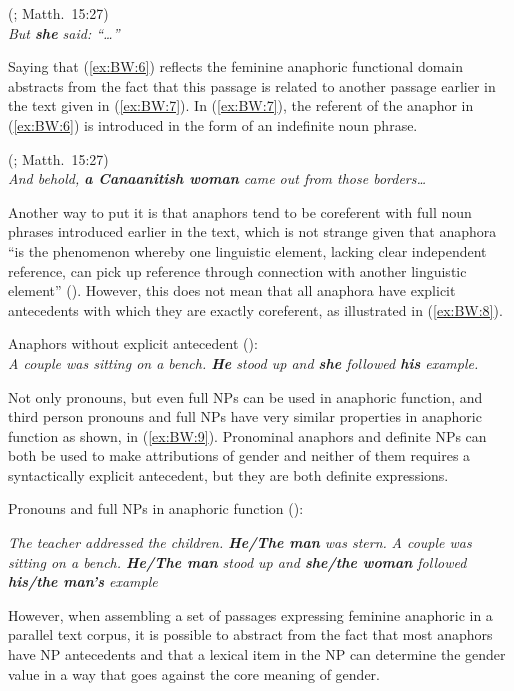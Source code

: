 \documentclass[output=collectionpaper]{langsci/langscibook}
\begin{document}
\ea\label{ex:BW:6}
 (; Matth.~15:27)\\
\textit{But \textbf{she} said: ``\ldots''}
\z

Saying that (\ref{ex:BW:6}) reflects the feminine anaphoric functional domain abstracts from the fact that this passage is related to another passage earlier in the text given in (\ref{ex:BW:7}). In (\ref{ex:BW:7}), the referent of the anaphor in (\ref{ex:BW:6}) is introduced in the form of an indefinite noun phrase.

\ea\label{ex:BW:7}
 (; Matth.~15:27)\\
\textit{And behold, \textbf{a Canaanitish woman} came out from those borders\ldots}
\z

Another way to put it is that anaphors tend to be coreferent with full noun phrases introduced earlier in the text, which is not strange given that anaphora “is the phenomenon whereby one linguistic element, lacking clear independent reference, can pick up reference through connection with another linguistic element” (\citealt[379]{Levinson1987}). However, this does not mean that all anaphora have explicit antecedents with which they are exactly coreferent, as illustrated in (\ref{ex:BW:8}).

\ea\label{ex:BW:8}
Anaphors without explicit antecedent (\citealt[98]{Hintikka1985}):\\
\textit{A couple was sitting on a bench. \textbf{He} stood up and \textbf{she} followed \textbf{his} example.}
\z

Not only pronouns, but even full NPs can be used in anaphoric function, and third person pronouns and full NPs have very similar properties in anaphoric function as shown, in (\ref{ex:BW:9}). Pronominal anaphors and definite NPs can both be used to make attributions of gender and neither of them requires a syntactically explicit antecedent, but they are both definite expressions.

\ea\label{ex:BW:9}
Pronouns and full NPs in anaphoric function (\citealt[98]{Hintikka1985}):\\
\begin{xlist}
\ex
\textit{The teacher addressed the children. \textbf{He/The man} was stern.}
\ex
\textit{A couple was sitting on a bench. \textbf{He/The man} stood up and \textbf{she/the woman} followed \textbf{his/the man’s} example}
\end{xlist}
\z

However, when assembling a set of passages expressing feminine anaphoric in a parallel text corpus, it is possible to abstract from the fact that most anaphors have NP antecedents and that a lexical item in the NP can determine the gender value in a way that goes against the core meaning of gender.
\end{document}

